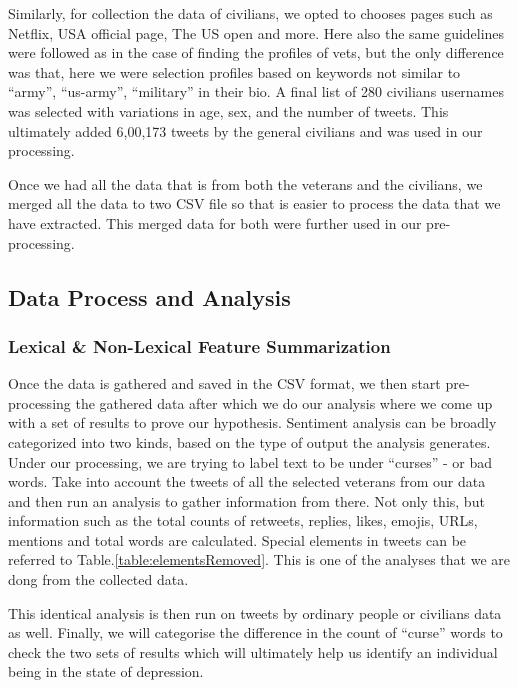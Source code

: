 Similarly, for collection the data of civilians, we opted to chooses pages such as Netflix, USA official page, The US open and more. Here also the same guidelines were followed as in the case of finding the profiles of vets, but the only difference was that, here we were selection profiles based on keywords not similar to “army”, “us-army”, “military” in their bio. A final list of 280 civilians usernames was selected with variations in age, sex, and the number of tweets. This ultimately added 6,00,173 tweets by the general civilians and was used in our processing.

Once we had all the data that is from both the veterans and the civilians, we merged all the data to two CSV file so that is easier to process the data that we have extracted. This merged data for both were further used in our pre-processing.

\subsection{Data Process and Analysis}

\subsubsection{Lexical \& Non-Lexical Feature Summarization}

Once the data is gathered and saved in the CSV format, we then start pre-processing the gathered data after which we do our analysis where we come up with a set of results to prove our hypothesis. Sentiment analysis can be broadly categorized into two kinds, based on the type of output the analysis generates. Under our processing, we are trying to label text to be under \enquote{curses} - or bad words. Take into account the tweets of all the selected veterans from our data and then run an analysis to gather information from there. Not only this, but information such as the total counts of retweets, replies, likes, emojis, URLs, mentions and total words are calculated. Special elements in tweets can be referred to Table.\ref{table:elementsRemoved}. This is one of the analyses that we are dong from the collected data.

This identical analysis is then run on tweets by ordinary people or civilians data as well. Finally, we will categorise the difference in the count of \enquote{curse} words to check the two sets of results which will ultimately help us identify an individual being in the state of depression.

